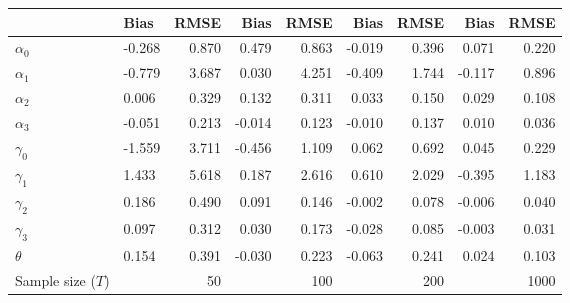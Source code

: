 
\begin{tabular}[t]{llrrrrrrr}
\toprule
  & Bias & RMSE & Bias & RMSE & Bias & RMSE & Bias & RMSE\\
\midrule
$\alpha_{0}$ & -0.268 & 0.870 & 0.479 & 0.863 & -0.019 & 0.396 & 0.071 & 0.220\\
$\alpha_{1}$ & -0.779 & 3.687 & 0.030 & 4.251 & -0.409 & 1.744 & -0.117 & 0.896\\
$\alpha_{2}$ & 0.006 & 0.329 & 0.132 & 0.311 & 0.033 & 0.150 & 0.029 & 0.108\\
$\alpha_{3}$ & -0.051 & 0.213 & -0.014 & 0.123 & -0.010 & 0.137 & 0.010 & 0.036\\
$\gamma_{0}$ & -1.559 & 3.711 & -0.456 & 1.109 & 0.062 & 0.692 & 0.045 & 0.229\\
$\gamma_{1}$ & 1.433 & 5.618 & 0.187 & 2.616 & 0.610 & 2.029 & -0.395 & 1.183\\
$\gamma_{2}$ & 0.186 & 0.490 & 0.091 & 0.146 & -0.002 & 0.078 & -0.006 & 0.040\\
$\gamma_{3}$ & 0.097 & 0.312 & 0.030 & 0.173 & -0.028 & 0.085 & -0.003 & 0.031\\
$\theta$ & 0.154 & 0.391 & -0.030 & 0.223 & -0.063 & 0.241 & 0.024 & 0.103\\
Sample size ($T$) &  & 50 &  & 100 &  & 200 &  & 1000\\
\bottomrule
\end{tabular}
